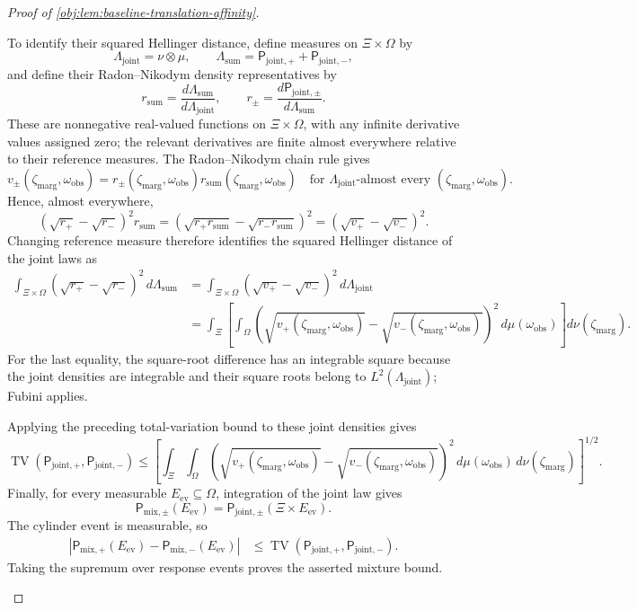 \begin{proof}[Proof of \cref{obj:lem:baseline-translation-affinity}]
\begin{enumerate}
To identify their squared Hellinger distance, define measures on \(\Xi\times\Omega\) by
\[
\Lambda_{\mathrm{joint}}=\nu\otimes\mu,
\qquad
\Lambda_{\mathrm{sum}}
=\mathsf P_{\mathrm{joint},+}+\mathsf P_{\mathrm{joint},-},
\]
and define their Radon--Nikodym density representatives by
\[
r_{\mathrm{sum}}
=\frac{d\Lambda_{\mathrm{sum}}}{d\Lambda_{\mathrm{joint}}},
\qquad
r_\pm
=\frac{d\mathsf P_{\mathrm{joint},\pm}}{d\Lambda_{\mathrm{sum}}}.
\]
These are nonnegative real-valued functions on \(\Xi\times\Omega\), with any infinite derivative values assigned zero; the relevant derivatives are finite almost everywhere relative to their reference measures. The Radon--Nikodym chain rule gives
\[
v_\pm(\zeta_{\mathrm{marg}},\omega_{\mathrm{obs}})=r_\pm(\zeta_{\mathrm{marg}},\omega_{\mathrm{obs}})r_{\mathrm{sum}}(\zeta_{\mathrm{marg}},\omega_{\mathrm{obs}})
\quad\text{for }\Lambda_{\mathrm{joint}}\text{-almost every }(\zeta_{\mathrm{marg}},\omega_{\mathrm{obs}}).
\]
Hence, almost everywhere,
\[
(\sqrt{r_+}-\sqrt{r_-})^2r_{\mathrm{sum}}
=
\left(\sqrt{r_+r_{\mathrm{sum}}}
      -\sqrt{r_-r_{\mathrm{sum}}}\right)^2
=(\sqrt{v_+}-\sqrt{v_-})^2.
\]
Changing reference measure therefore identifies the squared Hellinger distance of the joint laws as
\[
\begin{aligned}
\int_{\Xi\times\Omega}
(\sqrt{r_+}-\sqrt{r_-})^2\,d\Lambda_{\mathrm{sum}}
&=\int_{\Xi\times\Omega}
(\sqrt{v_+}-\sqrt{v_-})^2\,d\Lambda_{\mathrm{joint}}\\
&=\int_\Xi
\left[\int_\Omega
(\sqrt{v_+(\zeta_{\mathrm{marg}},\omega_{\mathrm{obs}})}-\sqrt{v_-(\zeta_{\mathrm{marg}},\omega_{\mathrm{obs}})})^2\,d\mu(\omega_{\mathrm{obs}})\right]d\nu(\zeta_{\mathrm{marg}}).
\end{aligned}
\]
For the last equality, the square-root difference has an integrable square because the joint densities are integrable and their square roots belong to \(L^2(\Lambda_{\mathrm{joint}})\); Fubini applies.

Applying the preceding total-variation bound to these joint densities gives
\[
\operatorname{TV}(\mathsf P_{\mathrm{joint},+},\mathsf P_{\mathrm{joint},-})
\le
\left[
\int_\Xi\int_\Omega
(\sqrt{v_+(\zeta_{\mathrm{marg}},\omega_{\mathrm{obs}})}-\sqrt{v_-(\zeta_{\mathrm{marg}},\omega_{\mathrm{obs}})})^2\,d\mu(\omega_{\mathrm{obs}})\,d\nu(\zeta_{\mathrm{marg}})
\right]^{1/2}.
\]
Finally, for every measurable \(E_{\mathrm{ev}}\subseteq\Omega\), integration of the joint law gives
\[
\mathsf P_{\mathrm{mix},\pm}(E_{\mathrm{ev}})
=\mathsf P_{\mathrm{joint},\pm}(\Xi\times E_{\mathrm{ev}}).
\]
The cylinder event is measurable, so
\[
\begin{aligned}
\left|\mathsf P_{\mathrm{mix},+}(E_{\mathrm{ev}})
      -\mathsf P_{\mathrm{mix},-}(E_{\mathrm{ev}})\right|
&\le
\operatorname{TV}(\mathsf P_{\mathrm{joint},+},\mathsf P_{\mathrm{joint},-}).
\end{aligned}
\]
Taking the supremum over response events proves the asserted mixture bound.


\end{enumerate}
\end{proof}
